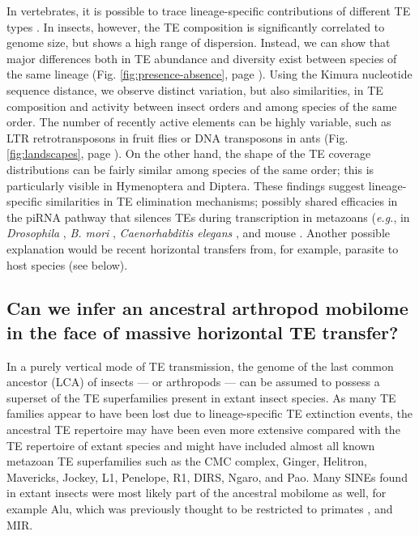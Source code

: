 In vertebrates, it is possible to trace lineage-specific contributions
of different TE types \citep{Chalopin2015}. In insects, however, the TE
composition is significantly correlated to genome size, but shows a high
range of dispersion. Instead, we can show that major differences both in
TE abundance and diversity exist between species of the same lineage
(Fig. \ref{fig:presence-absence}, page \pageref{fig:presence-absence}).
Using the Kimura nucleotide sequence distance, we observe distinct
variation, but also similarities, in TE composition and activity between
insect orders and among species of the same order. The number of
recently active elements can be highly variable, such as LTR
retrotransposons in fruit flies or DNA transposons in ants (Fig.
\ref{fig:landscapes}, page \pageref{fig:landscapes}). On the other hand,
the shape of the TE coverage distributions can be fairly similar among
species of the same order; this is particularly visible in Hymenoptera
and Diptera. These findings suggest lineage-specific similarities in TE
elimination mechanisms; possibly shared efficacies in the piRNA pathway
that silences TEs during transcription in metazoans (\emph{e.g.}, in
\emph{Drosophila} \citep{Yamashiro2017}, \emph{B. mori}
\citep{Matsumoto2016}, \emph{Caenorhabditis elegans}
\citep{Zhang2018}, and mouse \citep{LeThomas2013}. Another possible
explanation would be recent horizontal transfers from, for example,
parasite to host species (see below).

\subsection{Can we infer an ancestral arthropod mobilome in the face of
massive horizontal TE
transfer?}\label{can-we-infer-an-ancestral-arthropod-mobilome-in-the-face-of-massive-horizontal-te-transfer}

In a purely vertical mode of TE transmission, the genome of the last
common ancestor (LCA) of insects --- or arthropods --- can be assumed to
possess a superset of the TE superfamilies present in extant insect
species. As many TE families appear to have been lost due to
lineage-specific TE extinction events, the ancestral TE repertoire may
have been even more extensive compared with the TE repertoire of extant
species and might have included almost all known metazoan TE
superfamilies such as the CMC complex, Ginger, Helitron, Mavericks,
Jockey, L1, Penelope, R1, DIRS, Ngaro, and Pao. Many SINEs found in
extant insects were most likely part of the ancestral mobilome as well,
for example Alu, which was previously thought to be restricted to
primates \citep{Deininger2011}, and MIR.

